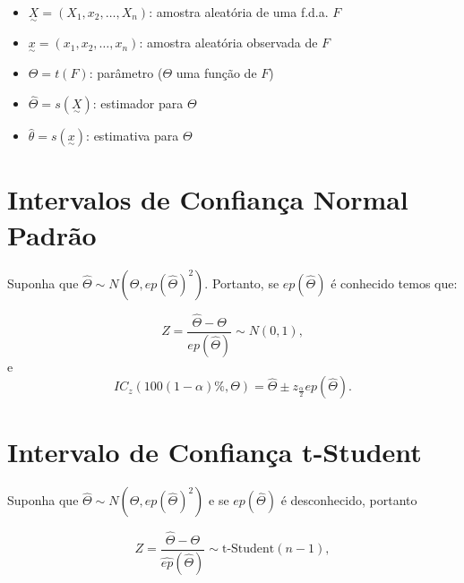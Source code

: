 \documentclass[
  letterpaper,
  DIV=11,
  numbers=noendperiod]{scrreprt}
\begin{document}
\begin{tcolorbox}[enhanced jigsaw, coltitle=black, bottomtitle=1mm, toprule=.15mm, arc=.35mm, colframe=quarto-callout-warning-color-frame, breakable, opacityback=0, bottomrule=.15mm, rightrule=.15mm, titlerule=0mm, toptitle=1mm, title=\textcolor{quarto-callout-warning-color}{\faExclamationTriangle}\hspace{0.5em}{Notação}, leftrule=.75mm, opacitybacktitle=0.6, left=2mm, colback=white, colbacktitle=quarto-callout-warning-color!10!white]

\begin{itemize}
\item
  \(\underset{\sim}{X} = (X_1, x_2, \dots, X_n)\): amostra aleatória de
  uma f.d.a. \(F\)
\item
  \(\underset{\sim}{x} = (x_1, x_2, \dots, x_n)\): amostra aleatória
  observada de \(F\)
\item
  \(\Theta=t(F)\): parâmetro (\(\Theta\) uma função de \(F\))
\item
  \(\hat{\Theta}=s(\underset{\sim}{X})\): estimador para \(\Theta\)
\item
  \(\hat{\theta}=s(\underset{\sim}{x})\): estimativa para \(\Theta\)
\end{itemize}

\end{tcolorbox}

\section{Intervalos de Confiança Normal
Padrão}\label{intervalos-de-confianuxe7a-normal-padruxe3o}

Suponha que \(\hat{\Theta}\sim N(\Theta, ep(\hat{\Theta})^2)\).
Portanto, se \(ep(\hat{\Theta})\) é conhecido temos que:

\[Z=\dfrac{\hat{\Theta} - \Theta}{ep(\hat\Theta)} \sim N(0,1),\] e
\[IC_z\left(100(1-\alpha)\%,\Theta\right)=\hat{\Theta} \pm z_{\frac{\alpha}{2}}ep(\hat{\Theta}).\]

\section{Intervalo de Confiança
t-Student}\label{intervalo-de-confianuxe7a-t-student}

Suponha que \(\hat{\Theta}\sim N(\Theta, ep(\hat{\Theta})^2)\) e se
\(ep(\hat{\Theta})\) é desconhecido, portanto

\[Z=\dfrac{\hat{\Theta} - \Theta}{\hat{ep}(\hat\Theta)} \sim \mbox{t-Student}(n-1),\]
\end{document}
